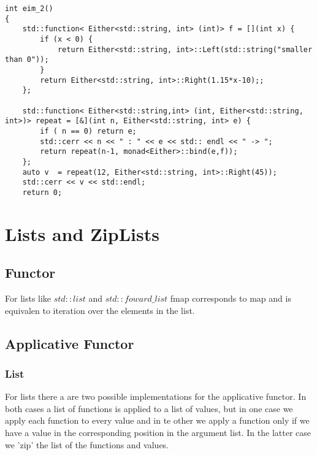 \documentclass[12pt,fleqn]{article}
\begin{document}
%
%
\begin{minipage}{\linewidth}
\begin{lstlisting}[caption=Example of the Either monad,label=eithermonadexamp]
int eim_2()
{
	std::function< Either<std::string, int> (int)> f = [](int x) {
		if (x < 0) {
			return Either<std::string, int>::Left(std::string("smaller than 0"));
		}
		return Either<std::string, int>::Right(1.15*x-10);;
	};

	std::function< Either<std::string,int> (int, Either<std::string, int>)> repeat = [&](int n, Either<std::string, int> e) {
		if ( n == 0) return e;
		std::cerr << n << " : " << e << std:: endl << " -> ";
		return repeat(n-1, monad<Either>::bind(e,f));
	}; 
	auto v  = repeat(12, Either<std::string, int>::Right(45));
	std::cerr << v << std::endl;
	return 0;
\end{lstlisting}
\end{minipage}
%
%
%


\section{Lists and ZipLists}
%
%
\subsection{Functor}

For lists like $std::list$ and $std::foward\_list$ fmap corresponds to map and is equivalen to iteration over the elements in the list.

  
%
%
\subsection{Applicative Functor}
%
%

\subsubsection{List}
%
For lists there a are two possible implementations for the applicative functor.
In both cases a list of functions is applied to a list of values, but in one case we apply each function to every value and in te other we apply a function 
only if we have a value in the corresponding position in the argument list. 
In the latter case we 'zip' the list of the functions and values.
\end{document}
